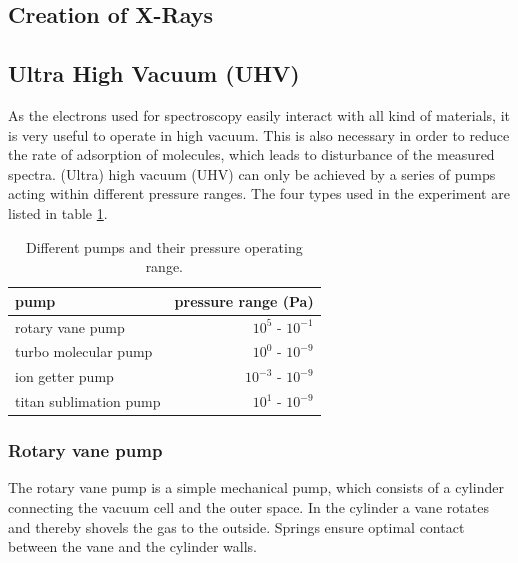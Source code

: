 \documentclass[a4paper]{scrartcl}
\numberwithin{equation}{section}
\numberwithin{figure}{section}
\numberwithin{table}{section}
\begin{document}
\subsection{Creation of X-Rays}

\subsection{Ultra High Vacuum (UHV)}
As the electrons used for spectroscopy easily interact with all kind of materials, it is very useful to operate in high vacuum. This is also necessary in order to reduce the rate of adsorption of molecules, which leads to disturbance of the measured spectra. (Ultra) high  vacuum (UHV) can only be achieved by a series of pumps acting within different pressure ranges. The four types used in the experiment are listed in table \ref{tab:pump}.
\begin{table}
\begin{tabular}{lr}
\toprule
pump & pressure range (Pa)\\
\midrule
\small rotary vane pump & $10^5$ - $10^{-1}$  \\ 
\small turbo molecular pump &  $10^0$  - $10^{-9}$  \\
\small ion getter pump  & $ 10^{-3}$  - $10^{-9}$  \\
\small titan sublimation pump & $10^1$  - $10^{-9}$  \\
\bottomrule
\end{tabular}
\caption{Different pumps and their pressure operating range. \cite{gop} }
\label{tab:pump}
\end{table}

\subsubsection{Rotary vane pump}
The rotary vane pump is a simple mechanical pump, which consists of a cylinder connecting the vacuum cell and the outer space. In the cylinder a vane rotates and thereby shovels the gas to the outside. Springs ensure optimal contact between the vane and the cylinder walls. 
\end{document}
